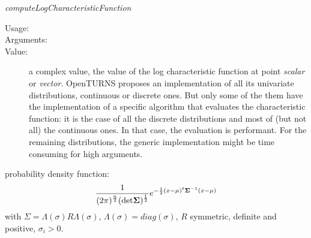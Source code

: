 \begin{description}
\begin{description}
\item \textit{computeLogCharacteristicFunction}
\begin{description}
\item[Usage:] \rule{0pt}{1em}
\item[Arguments:] \rule{0pt}{1em}
\item[Value:] a complex value, the value of the log characteristic function at point \textit{scalar} or \textit{vector}. OpenTURNS proposes an implementation of all its univariate distributions, continuous or discrete ones. But only some of the them have the implementation of a specific algorithm that evaluates the characteristic function: it is the case of all the discrete distributions and most of (but not all) the continuous ones. In that case, the evaluation is performant. For the remaining distributions, the generic implementation might be time consuming for high arguments.
\end{description}
\bigskip

\end{description}

\item[Details:]
\begin{description}
\item probability density function:
\begin{equation}\displaystyle
\frac{1}
{
\displaystyle (2\pi)^{\frac{n}{2}}(\mathrm{det}\mathbf{\Sigma})^{\frac{1}{2}}
}
\displaystyle e^{-\frac{1}{2}{{(x-\mu)}^t}\mathbf{\Sigma}^{-1}(x-\mu)}
\end{equation}
with $\Sigma = \Lambda(\sigma) R \Lambda(\sigma)$, $\Lambda(\sigma) = diag(\sigma)$, $R$ symmetric, definite and positive, $\sigma_i >0$.

\end{description}

\item[Links:]  \rule{0pt}{1em}

\end{description}


